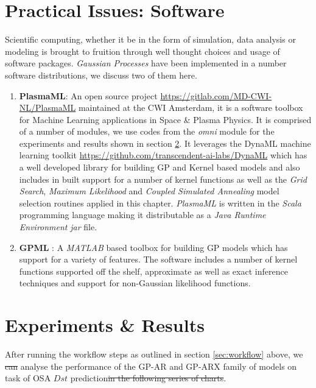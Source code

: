 \documentclass{article}
\providecommand{\DIFadd}[1]{{\protect\color{blue}\uwave{#1}}} %
\providecommand{\DIFdel}[1]{{\protect\color{red}\sout{#1}}}                      %
\providecommand{\DIFaddbegin}{} %
\providecommand{\DIFaddend}{} %
\providecommand{\DIFdelbegin}{} %
\providecommand{\DIFdelend}{} %
\newcommand{\DIFscaledelfig}{0.5}
\newlength{\DIFdelgraphicswidth} %
\newlength{\DIFdelgraphicsheight} %
\newcommand{\DIFaddincludegraphics}[2][]{{\color{blue}\fbox{\DIFOincludegraphics[#1]{#2}}}} %
\newcommand{\DIFdelincludegraphics}[2][]{%
\sbox{\DIFdelgraphicsbox}{\DIFOincludegraphics[#1]{#2}}%
\settoboxwidth{\DIFdelgraphicswidth}{\DIFdelgraphicsbox} %
\settoboxtotalheight{\DIFdelgraphicsheight}{\DIFdelgraphicsbox} %
\scalebox{\DIFscaledelfig}{%
\parbox[b]{\DIFdelgraphicswidth}{\usebox{\DIFdelgraphicsbox}\\[-\baselineskip] \rule{\DIFdelgraphicswidth}{0em}}\llap{\resizebox{\DIFdelgraphicswidth}{\DIFdelgraphicsheight}{%
\setlength{\unitlength}{\DIFdelgraphicswidth}%
\begin{picture}(1,1)%
\thicklines\linethickness{2pt} %
{\color[rgb]{1,0,0}\put(0,0){\framebox(1,1){}}}%
{\color[rgb]{1,0,0}\put(0,0){\line( 1,1){1}}}%
{\color[rgb]{1,0,0}\put(0,1){\line(1,-1){1}}}%
\end{picture}%
}\hspace*{3pt}}} %
} %
\DeclareRobustCommand{\DIFaddbegin}{\DIFOaddbegin \let\includegraphics\DIFaddincludegraphics} %
\DeclareRobustCommand{\DIFaddend}{\DIFOaddend \let\includegraphics\DIFOincludegraphics} %
\DeclareRobustCommand{\DIFdelbegin}{\DIFOdelbegin \let\includegraphics\DIFdelincludegraphics} %
\DeclareRobustCommand{\DIFdelend}{\DIFOaddend \let\includegraphics\DIFOincludegraphics} %
\begin{document}
\section{Practical Issues: Software}

Scientific computing, whether it be in the form of simulation, data analysis or modeling is brought to fruition through well thought choices and usage of software packages. \emph{Gaussian Processes} have been implemented in a number software distributions, we discuss two of them here.

\begin{enumerate}

\item \textbf{PlasmaML}: An open source project \url{https://gitlab.com/MD-CWI-NL/PlasmaML} maintained at the CWI Amsterdam, it is a software toolbox for Machine Learning applications in Space \& Plasma Physics. It is comprised of a number of modules, we use codes from the \textit{omni} module for the experiments and results shown in section \ref{sec:results}. It leverages the DynaML machine learning toolkit \url{https://github.com/transcendent-ai-labs/DynaML} which has a well developed library for building GP and Kernel based models and also includes in built support for a number of kernel functions as well as the \emph{Grid Search}, \emph{Maximum Likelihood} and \emph{Coupled Simulated Annealing} model selection routines applied in this chapter. \textit{PlasmaML} is written in the \textit{Scala} programming language making it distributable as a \emph{Java Runtime Environment} \textit{jar} file.

\item \textbf{GPML} \citep{GPML}: A \emph{MATLAB} based toolbox for building GP models which has support for a variety of features. The software includes a number of kernel functions supported off the shelf, approximate as well as exact inference techniques and support for non-Gaussian likelihood functions. 
\end{enumerate}

\section{Experiments \& Results}\label{sec:results}

After running the workflow steps as outlined in section
\ref{sec:workflow} above, we \DIFdelbegin \DIFdel{can }\DIFdelend \DIFaddbegin \DIFadd{are at a position to }\DIFaddend analyse the
performance of the GP-AR and GP-ARX family of models on task of OSA
$Dst$ prediction\DIFdelbegin \DIFdel{in the following series of charts}\DIFdelend .
\end{document}
